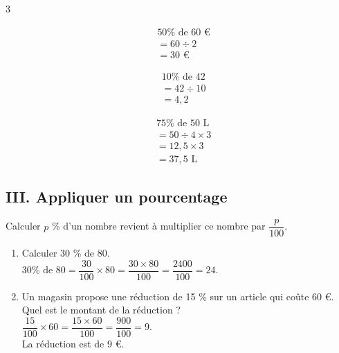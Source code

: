\begin{Exemple}
\vspace{-1.5cm}
\begin{multicols}{3}

\begin{align*}
&50\% \text{ de } 60\text{ €}\\
&= 60 \div 2\\
&= 30 \text{ €}
\end{align*}

\begin{align*}
&10\% \text{ de } 42\\
&= 42 \div 10\\
&= 4,2 
\end{align*}

\begin{align*}
&75\% \text{ de } 50 \text{ L}\\
&= 50 \div 4 \times 3\\
&= 12,5 \times 3 \\
&= 37,5 \text{ L}
\end{align*}

\end{multicols}
\vspace{-0.5cm}
\end{Exemple}

\subsection*{III. Appliquer un pourcentage}

\begin{Règle}[c]
Calculer $p$ \% d'un nombre revient à multiplier ce nombre par $\dfrac{p}{100}$.
\end{Règle}

\begin{Exemples}
\begin{enumerate}
\item Calculer 30 \% de 80. \\ 
$30 \%\text{ de }80 =\dfrac{30}{100} \times 80 = \dfrac{30 \times 80}{100} = \dfrac{2400}{100} = 24$.



\item Un magasin propose une réduction de 15 \% sur un article qui coûte 60 €.\\ Quel est le montant de la réduction ?\\
$\dfrac{15}{100} \times 60=\dfrac{15 \times 60}{100} = \dfrac{900}{100} = 9$.\\
La réduction est de 9 €.
\end{enumerate}
\end{Exemples}